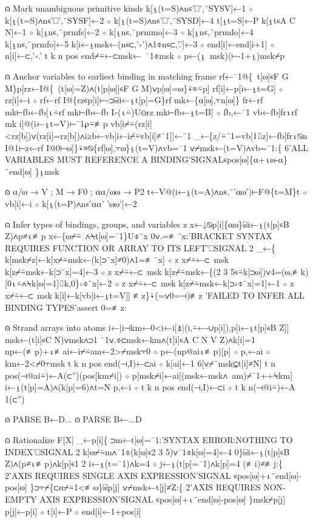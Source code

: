 \documentclass{article}%
\begin{document}
⍝ Mark unambiguous primitive kinds
         k[⍸(t=S)∧n∊'⎕',¨SYSV]←1 ⋄ k[⍸(t=S)∧n∊'⎕',¨SYSF]←2 ⋄ k[⍸(t=S)∧n∊'⎕',¨SYSD]←4
         t[⍸t=S]←P
         k[⍸t∊A C N]←1 ⋄ k[⍸n∊,¨prmfs]←2 ⋄ k[⍸n∊,¨prmmo]←3 ⋄ k[⍸n∊,¨prmdo]←4
         k[⍸n∊,¨prmfo]←5
         k[i←⍸msk←(n∊⊂,'∘')∧1⌽n∊⊂,'.']←3 ⋄ end[i]←end[i+1] ⋄ n[i]←⊂,'∘.'
         t k n pos end⌿⍨←⊂msk←~¯1⌽msk ⋄ p←(⍸~msk)(⊢-1+⍸)msk⌿p

⍝ Anchor variables to earliest binding in matching frame
         rf←¯1@\{~t[⍵]∊F G M\}p[rz←I@\{~(t[⍵]=Z)∧(t[p[⍵]]∊F G M)∨p[⍵]=⍵\}⍣≡⍨p]
         rf[i]←p[i←⍸t=G] ⋄ rz[i]←i ⋄ rf←rf I@\{rz∊p[i]⊢∘⊃⌸i←⍸t[p]=G\}rf
         mk←\{⍺[⍵],⍪n[⍵]\}
         fr←rf mk⊢fb←fb[⍳⍨rf mk⊢fb←fb I∘(⍳⍨)U⊖rz mk⊢fb←⍸t=B] ⋄ fb,←¯1
         vb←fb[fr⍳rf mk i]@(i←⍸t=V)⊢¯1⍴⍨≢p
         vb[i⌿⍨(rz[i]<rz[b])∨(rz[i]=rz[b])∧i≥b←vb[i←i⌿⍨vb[i]≠¯1]]←¯1
         _←\{z/⍨¯1=vb[1⌷z]←fb[fr⍳⍉n I@1⊢z←rf I@0⊢⍵]\}⍣≡⍉\{rf[⍵],⍪⍵\}⍸(t=V)∧vb=¯1
         ∨⌿msk←(t=V)∧vb=¯1:\{
                 6'ALL VARIABLES MUST REFERENCE A BINDING'SIGNAL∊pos[⍵]\{⍺+⍳⍵-⍺\}¨end[⍵]
         \}⍸msk

⍝ ⍺/⍵ → V ; M → F0 ; ⍺⍺/⍵⍵ → P2
         t←V@(i←⍸(t=A)∧n∊,¨'⍺⍵')⊢F@\{t=M\}t ⋄ vb[i]←i ⋄ k[⍸(t=P)∧n∊'⍺⍺' '⍵⍵']←2

⍝ Infer types of bindings, groups, and variables
         z x←↓⍉p[i]\{⍺⍵\}⌸i←⍸(t[p]∊B Z)∧p≠⍳≢p
         x←\{⍵⌿⍨~∧⍀t[⍵]=¯1\}U⌽¨x
         0∨.=≢¨x:'BRACKET SYNTAX REQUIRES FUNCTION OR ARRAY TO ITS LEFT'⎕SIGNAL 2
         _←\{
                 k[msk⌿z]←k[x⌿⍨msk←(k[⊃¨x]≠0)∧1=≢¨x] ⋄ z x⌿⍨←⊂~msk
                 k[z⌿⍨msk←k[⊃¨x]=4]←3 ⋄ z x⌿⍨←⊂~msk
                 k[z⌿⍨msk←\{(2 3 5∊⍨k[⊃⍵])∨4=(⍵,≢k)[0⍳⍨∧⍀k[⍵]=1]⌷k,0\}∘⌽¨x]←2 ⋄ z x⌿⍨←⊂~msk
                 k[z⌿⍨msk←k[⊃∘⌽¨x]=1]←1 ⋄ z x⌿⍨←⊂~msk
                 k[i]←k[vb[i←⍸t=V]]
         ≢z\}⍣(=∨0=⊣)≢z
         'FAILED TO INFER ALL BINDING TYPES'assert 0=≢z:

⍝ Strand arrays into atoms
         i←|i⊣km←0<i←i[⍋|(i,⍨←-∪p[i]),p[i←⍸t[p]∊B Z]]
         msk←(t[i]∊C N)∨msk∧⊃1 ¯1∨.⌽⊂msk←km∧(t[i]∊A C N V Z)∧k[i]=1
         np←(≢p)+⍳≢ai←i⌿⍨am←2>⌿msk⍪0 ⋄ p←(np@ai⍳≢p)[p] ⋄ p,←ai ⋄ km←2<⌿0⍪msk
         t k n pos end(⊣,I)←⊂ai ⋄ k[ai]←1 6[∨⌿¨msk⊆t[i]≠N]
         t n pos(⊣@ai⍨)←A(⊂'')(pos[km⌿i]) ⋄ p[msk⌿i]←ai[(msk←msk∧~am)⌿¯1++⍀km]
         i←⍸(t[p]=A)∧(k[p]=6)∧t=N
         p,←i ⋄ t k n pos end(⊣,I)←⊂i ⋄ t k n(⊣@i⍨)←A 1(⊂'')

⍝ PARSE B←D...
⍝ PARSE B←...D

⍝ Rationalize F[X]
         _←p[i]\{
                 ⊃m←t[⍵]=¯1:'SYNTAX ERROR:NOTHING TO INDEX'⎕SIGNAL 2
                 k[⍵⌿⍨m∧¯1⌽(k[⍵]∊2 3 5)∨¯1⌽k[⍵]=4]←4
         0\}⌸i←⍸(t[p]∊B Z)∧(p≠⍳≢p)∧k[p]∊1 2
         i←⍸(t=¯1)∧k=4 ⋄ j←⍸(t[p]=¯1)∧k[p]=4
         (≢i)≠≢j:\{
                 2'AXIS REQUIRES SINGLE AXIS EXPRESSION'SIGNAL ∊pos[⍵]+⍳¨end[⍵]-pos[⍵]
         \}⊃⍪⌿\{⊂⍺⌿⍨1<≢⍵\}⌸p[j]
         ∨⌿msk←t[j]≠Z:\{
                 2'AXIS REQUIRES NON-EMPTY AXIS EXPRESSION'SIGNAL ∊pos[⍵]+⍳¨end[⍵]-pos[⍵]
         \}msk⌿p[j]
         p[j]←p[i] ⋄ t[i]←P ⋄ end[i]←1+pos[i]
\end{document}
